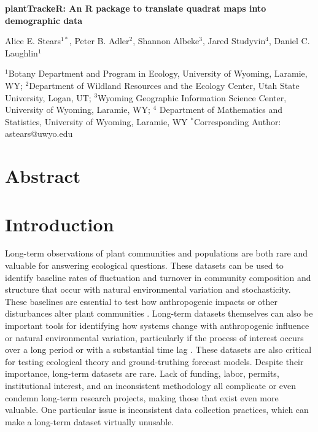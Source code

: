 \documentclass[12pt, letterpaper]{article}
\begin{document}
\begin{flushleft}
\Large{\textbf{plantTrackeR: An R package to translate quadrat maps into demographic data }} 

\normalsize{Alice E. Stears$^{1*}$, Peter B. Adler$^2$, Shannon Albeke$^{3}$, Jared Studyvin$^{4}
$, Daniel C. Laughlin$^1$}

\small{$^1$Botany Department and Program in Ecology, University of Wyoming, Laramie, WY; \linebreak
$^2$Department of Wildland Resources and the Ecology Center, Utah State University, Logan, UT; \linebreak
$^3$Wyoming Geographic Information Science Center, University of Wyoming,
Laramie, WY; \linebreak
$^4$ Department of Mathematics and Statistics, University of Wyoming, Laramie, WY \linebreak 
}
\small{$^*$Corresponding Author: astears@uwyo.edu}

\end{flushleft}

\section{Abstract}
\section{Introduction}
Long-term observations of plant communities and populations are both rare and valuable for answering ecological questions. These datasets can be used to identify baseline rates of fluctuation and turnover in community composition and structure that occur with natural environmental variation and stochasticity. These baselines are essential to test how anthropogenic impacts or other disturbances alter plant communities \cite{Magurran2010}. Long-term datasets themselves can also be important tools for identifying how systems change with anthropogenic influence or natural environmental variation, particularly if the process of interest occurs over a long period or with a substantial time lag \cite{Lindenmayer2012}. These datasets are also critical for testing ecological theory and ground-truthing forecast models. Despite their importance, long-term datasets are rare. Lack of funding, labor, permits, institutional interest, and an inconsistent methodology all complicate or even condemn long-term research projects, making those that exist even more valuable. One particular issue is inconsistent data collection practices, which can make a long-term dataset virtually unusable.
\end{document}
